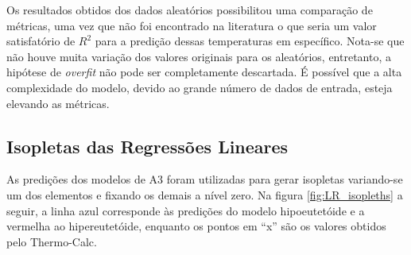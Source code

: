 \documentclass[brazil,tf,epusp]{usp}  %
\begin{document}
Os resultados obtidos dos dados aleatórios possibilitou uma comparação de métricas, uma vez que não foi encontrado na literatura o que seria um valor satisfatório de $R^{2}$ para a predição dessas temperaturas em específico. Nota-se que não houve muita variação dos valores originais para os aleatórios, entretanto, a hipótese de \textit{overfit} não pode ser completamente descartada. É possível que a alta complexidade do modelo, devido ao grande número de dados de entrada, esteja elevando as métricas.

\subsection{Isopletas das Regressões Lineares}

As predições dos modelos de A3 foram utilizadas para gerar isopletas variando-se um dos elementos e fixando os demais a nível zero. Na figura \ref{fig:LR_isopleths} a seguir, a linha azul corresponde às predições do modelo hipoeutetóide e a vermelha ao hipereutetóide, enquanto os pontos em ``x'' são os valores obtidos pelo Thermo-Calc\textregistered{}.
\end{document}
